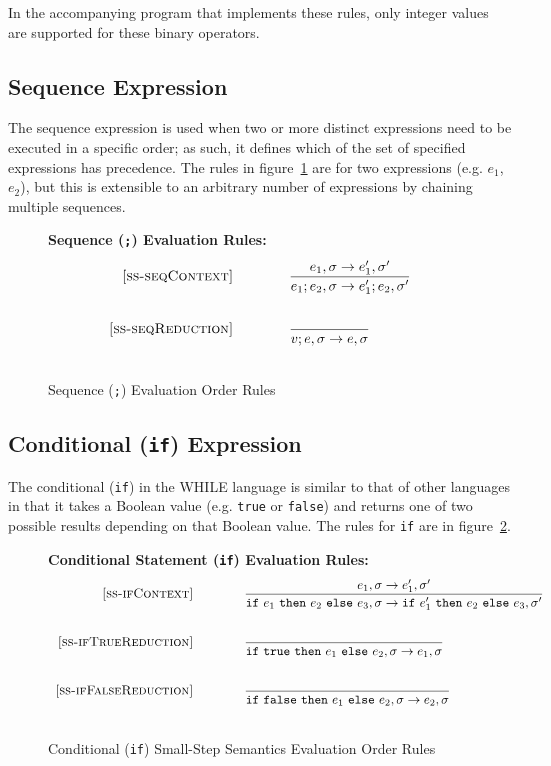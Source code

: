 \documentclass{article}
\newcommand{\ife}[3]{\mbox{\tt if}~{#1}~\mbox{\tt then}~{#2}~\mbox{\tt else}~{#3}}
\newcommand{\true}{\mbox{\tt true}}
\newcommand{\false}{\mbox{\tt false}}
\begin{document}
In the accompanying program that implements these rules, only integer values are supported for these binary operators. 


\subsection{Sequence Expression}

The sequence expression is used when two or more distinct expressions need to be executed in a specific order; as such, it defines which of the set of specified expressions has precedence.  The rules in figure~\ref{fig:seqRules} are for two expressions (e.g. $e_1$, $e_2$), but this is extensible to an arbitrary number of expressions by chaining multiple sequences.

\begin{figure}[H]
\caption{Sequence ({\tt ;}) Evaluation Order Rules}
\label{fig:seqRules}
{\bf Sequence ({\tt ;}) Evaluation Rules:}
\[
\\
\begin{array}{r@{\qquad\qquad}l}
\ssrule{ss-seqContext}{
  \sstep{e_1}{\sigma}{e_1'}{\sigma'}
}{
  \sstep{e_1 ; e_2}{\sigma}{e_1' ; e_2}{\sigma'}
}
\ssrule{ss-seqReduction}{
}{
  \sstep{v ; e}{\sigma}{e}{\sigma}
}
\end{array}
\]
\end{figure}

\subsection{Conditional ({\tt if}) Expression}

The conditional ({\tt if}) in the WHILE language is similar to that of other languages in that it takes a Boolean value (e.g. {\true} or {\false}) and returns one of two possible results depending on that Boolean value.  The rules for {\tt if} are in figure~\ref{fig:condRules}.

\begin{figure}[H]
\caption{Conditional ({\tt if}) Small-Step Semantics Evaluation Order Rules}
\label{fig:condRules}
{\bf Conditional Statement ({\tt if}) Evaluation Rules:}
\[
\\
\begin{array}{r@{\qquad\qquad}l}
\ssrule{ss-ifContext}{
  \sstep{e_1}{\sigma}{e_1'}{\sigma'}
}{
  \sstep{\ife{e_1}{e_2}{e_3}}{\sigma}{\ife{e_1'}{e_2}{e_3}}{\sigma'}
}
\ssrule{ss-ifTrueReduction}{
}{
  \sstep{\ife{\true}{e_1}{e_2}}{\sigma}{e_1}{\sigma}
}
\ssrule{ss-ifFalseReduction}{
}{
  \sstep{\ife{\false}{e_1}{e_2}}{\sigma}{e_2}{\sigma}
}
\end{array}
\]
\end{figure}
\end{document}
